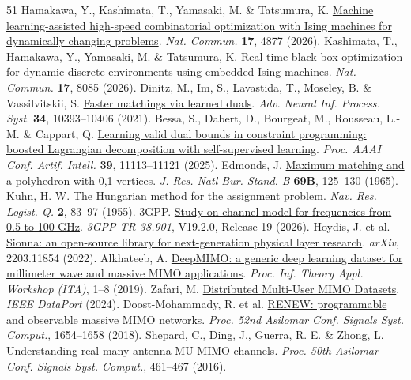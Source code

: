 \documentclass[10pt,letterpaper]{article}
\begin{document}
\begin{thebibliography}{51}
 Hamakawa, Y., Kashimata, T., Yamasaki, M. \& Tatsumura, K. \href{https://doi.org/10.1038/s41467-026-73725-6}{Machine learning-assisted high-speed combinatorial optimization with Ising machines for dynamically changing problems}. \emph{Nat. Commun.} \textbf{17}, 4877 (2026).
 Kashimata, T., Hamakawa, Y., Yamasaki, M. \& Tatsumura, K. \href{https://doi.org/10.1038/s41467-026-76069-3}{Real-time black-box optimization for dynamic discrete environments using embedded Ising machines}. \emph{Nat. Commun.} \textbf{17}, 8085 (2026).
 Dinitz, M., Im, S., Lavastida, T., Moseley, B. \& Vassilvitskii, S. \href{https://proceedings.neurips.cc/paper/2021/hash/5616060fb8ae85d93f334e7267307664-Abstract.html}{Faster matchings via learned duals}. \emph{Adv. Neural Inf. Process. Syst.} \textbf{34}, 10393–10406 (2021).
 Bessa, S., Dabert, D., Bourgeat, M., Rousseau, L.-M. \& Cappart, Q. \href{https://doi.org/10.1609/aaai.v39i11.33208}{Learning valid dual bounds in constraint programming: boosted Lagrangian decomposition with self-supervised learning}. \emph{Proc. AAAI Conf. Artif. Intell.} \textbf{39}, 11113–11121 (2025).
 Edmonds, J. \href{https://doi.org/10.6028/jres.069B.013}{Maximum matching and a polyhedron with 0,1-vertices}. \emph{J. Res. Natl Bur. Stand. B} \textbf{69B}, 125–130 (1965).
 Kuhn, H. W. \href{https://doi.org/10.1002/nav.3800020109}{The Hungarian method for the assignment problem}. \emph{Nav. Res. Logist. Q.} \textbf{2}, 83–97 (1955).
 3GPP. \href{https://www.etsi.org/deliver/etsi_tr/138900_138999/138901/19.02.00_60/tr_138901v190200p.pdf}{Study on channel model for frequencies from 0.5 to 100 GHz}. \emph{3GPP TR 38.901}, V19.2.0, Release 19 (2026).
 Hoydis, J. et al. \href{https://doi.org/10.48550/arXiv.2203.11854}{Sionna: an open-source library for next-generation physical layer research}. \emph{arXiv}, 2203.11854 (2022).
 Alkhateeb, A. \href{https://arxiv.org/abs/1902.06435}{DeepMIMO: a generic deep learning dataset for millimeter wave and massive MIMO applications}. \emph{Proc. Inf. Theory Appl. Workshop (ITA)}, 1–8 (2019).
 Zafari, M. \href{https://doi.org/10.21227/74ez-b275}{Distributed Multi-User MIMO Datasets}. \emph{IEEE DataPort} (2024).
 Doost-Mohammady, R. et al. \href{https://doi.org/10.1109/ACSSC.2018.8645391}{RENEW: programmable and observable massive MIMO networks}. \emph{Proc. 52nd Asilomar Conf. Signals Syst. Comput.}, 1654–1658 (2018).
 Shepard, C., Ding, J., Guerra, R. E. \& Zhong, L. \href{https://doi.org/10.1109/ACSSC.2016.7869082}{Understanding real many-antenna MU-MIMO channels}. \emph{Proc. 50th Asilomar Conf. Signals Syst. Comput.}, 461–467 (2016).

\end{thebibliography}
\end{document}
